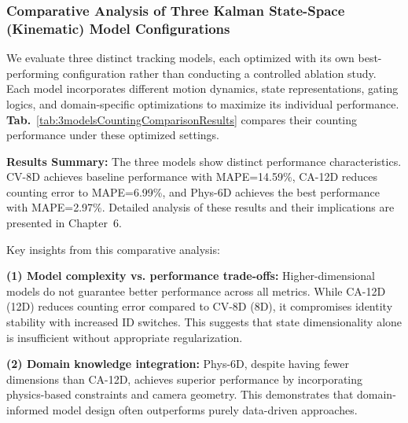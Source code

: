 \subsubsection{Comparative Analysis of Three Kalman State-Space (Kinematic) Model Configurations}
We evaluate three distinct tracking models, each optimized with its own best-performing configuration rather than conducting a controlled ablation study. Each model incorporates different motion dynamics, state representations, gating logics, and domain-specific optimizations to maximize its individual performance. \textbf{Tab.}~\ref{tab:3modelsCountingComparisonResults} compares their counting performance under these optimized settings.

\textbf{Results Summary:} The three models show distinct performance characteristics. CV-8D achieves baseline performance with MAPE=14.59\%, CA-12D reduces counting error to MAPE=6.99\%, and Phys-6D achieves the best performance with MAPE=2.97\%. Detailed analysis of these results and their implications are presented in Chapter~6.
\begin{table}[H]
    \centering
    \caption{Counting Performance Comparison of the Three Models}
    \label{tab:3modelsCountingComparisonResults}
\end{table}
Key insights from this comparative analysis:

\textbf{(1) Model complexity vs. performance trade-offs:} Higher-dimensional models do not guarantee better performance across all metrics. While CA-12D (12D) reduces counting error compared to CV-8D (8D), it compromises identity stability with increased ID switches. This suggests that state dimensionality alone is insufficient without appropriate regularization.

\textbf{(2) Domain knowledge integration:} Phys-6D, despite having fewer dimensions than CA-12D, achieves superior performance by incorporating physics-based constraints and camera geometry. This demonstrates that domain-informed model design often outperforms purely data-driven approaches.

